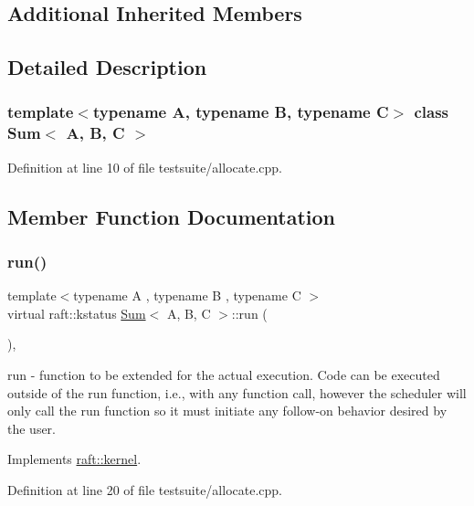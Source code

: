 \subsection*{Additional Inherited Members}


\subsection{Detailed Description}
\subsubsection*{template$<$typename A, typename B, typename C$>$\newline
class Sum$<$ A, B, C $>$}



Definition at line 10 of file testsuite/allocate.\+cpp.



\subsection{Member Function Documentation}
\hypertarget{class_sum_ab915892675d11a8f3f0de2e7f96b0d28}{}\label{class_sum_ab915892675d11a8f3f0de2e7f96b0d28} 
\subsubsection{\texorpdfstring{run()}{run()}\hspace{0.1cm}{\footnotesize\ttfamily [1/3]}}
{\footnotesize\ttfamily template$<$typename A , typename B , typename C $>$ \\
virtual raft\+::kstatus \hyperlink{class_sum}{Sum}$<$ A, B, C $>$\+::run (\begin{DoxyParamCaption}{ }\end{DoxyParamCaption})\hspace{0.3cm}{\ttfamily [inline]}, {\ttfamily [virtual]}}

run -\/ function to be extended for the actual execution. Code can be executed outside of the run function, i.\+e., with any function call, however the scheduler will only call the run function so it must initiate any follow-\/on behavior desired by the user. 

Implements \hyperlink{classraft_1_1kernel_a05094286d7577360fb1b91c91fc05901}{raft\+::kernel}.



Definition at line 20 of file testsuite/allocate.\+cpp.



